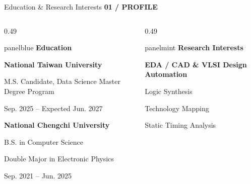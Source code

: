 \documentclass[aspectratio=169,10pt]{beamer}
\newcommand{\smalllabel}[1]{{\scriptsize\bfseries\color{Accent}\MakeUppercase{#1}}}
\begin{document}
\begin{frame}{Education \& Research Interests}
  \vspace{0.05cm}
  \smalllabel{01 / Profile}\par\vspace{0.10cm}
  \vfill
  \begin{columns}[T,onlytextwidth]
    \begin{column}{0.49\textwidth}
      \begin{beamercolorbox}[rounded=true,sep=0.20cm,wd=\linewidth]{panelblue}
        {\large\bfseries\color{AccentBlue}Education}\par
        \vspace{0.14cm}
        {\normalsize\bfseries National Taiwan University}\par
        {\normalsize M.S. Candidate, Data Science Master Degree Program}\par
        {\small\color{Muted}Sep. 2025 -- Expected Jun. 2027}\par
        \vspace{0.23cm}
        {\normalsize\bfseries National Chengchi University}\par
        {\normalsize B.S. in Computer Science}\par
        {\normalsize Double Major in Electronic Physics}\par
        {\small\color{Muted}Sep. 2021 -- Jun. 2025}
      \end{beamercolorbox}
    \end{column}
    \begin{column}{0.49\textwidth}
      \begin{beamercolorbox}[rounded=true,sep=0.20cm,wd=\linewidth]{panelmint}
        {\large\bfseries\color{Accent}Research Interests}\par
        \vspace{0.15cm}
        {\normalsize\bfseries EDA / CAD \& VLSI Design Automation}\par
        \vspace{0.09cm}
        {\normalsize Logic Synthesis}\par
        {\normalsize Technology Mapping}\par
        {\normalsize Static Timing Analysis}\par

\end{beamercolorbox}
\end{column}
\end{columns}
\end{frame}
\end{document}
